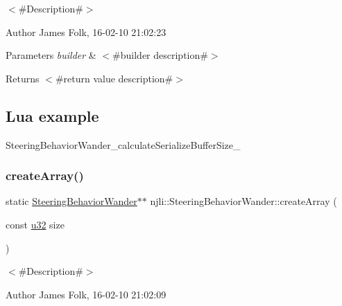 $<$\#\+Description\#$>$ 

\begin{DoxyAuthor}{Author}
James Folk, 16-\/02-\/10 21\+:02\+:23
\end{DoxyAuthor}

\begin{DoxyParams}{Parameters}
{\em builder} & $<$\#builder description\#$>$\\
\hline
\end{DoxyParams}
\begin{DoxyReturn}{Returns}
$<$\#return value description\#$>$
\end{DoxyReturn}
\hypertarget{classnjli_1_1_steering_behavior_wander_ex1}{}\subsection{Lua example}\label{classnjli_1_1_steering_behavior_wander_ex1}

\begin{DoxyCodeInclude}
\end{DoxyCodeInclude}
Steering\+Behavior\+Wander\+\_\+calculate\+Serialize\+Buffer\+Size\+\_\+ \mbox{\label{classnjli_1_1_steering_behavior_wander_a37ab46366d8e544c61aa6120012c7861}} 
\subsubsection{\texorpdfstring{create\+Array()}{createArray()}}
{\footnotesize\ttfamily static \mbox{\hyperlink{classnjli_1_1_steering_behavior_wander}{Steering\+Behavior\+Wander}}$\ast$$\ast$ njli\+::\+Steering\+Behavior\+Wander\+::create\+Array (\begin{DoxyParamCaption}\item[{const \mbox{\hyperlink{_util_8h_a10e94b422ef0c20dcdec20d31a1f5049}{u32}}}]{size }\end{DoxyParamCaption})\hspace{0.3cm}{\ttfamily [static]}}



$<$\#\+Description\#$>$ 

\begin{DoxyAuthor}{Author}
James Folk, 16-\/02-\/10 21\+:02\+:09
\end{DoxyAuthor}

